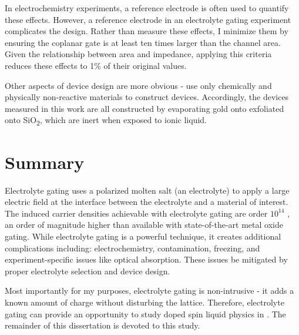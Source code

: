 In electrochemistry experiments, a reference electrode is often used to quantify these effects. However, a reference electrode in an electrolyte gating experiment complicates the design. Rather than measure these effects, I minimize them by ensuring the coplanar gate is at least ten times larger than the channel area. Given the relationship between area and impedance, applying this criteria reduces these effects to 1\% of their original values.

Other aspects of device design are more obvious - use only chemically and physically non-reactive materials to construct devices. Accordingly, the devices measured in this work are all constructed by evaporating gold onto \rucl exfoliated onto SiO\textsubscript{2}, which are inert when exposed to ionic liquid.

\section{Summary}

Electrolyte gating uses a polarized molten salt (an electrolyte) to apply a large electric field at the interface between the electrolyte and a material of interest. The induced carrier densities achievable with electrolyte gating are order $10^{14}$ \percmsq , an order of magnitude higher than available with state-of-the-art metal oxide gating. While electrolyte gating is a powerful technique, it creates additional complications including: electrochemistry, contamination, freezing, and experiment-specific issues like optical absorption. These issues be mitigated by proper electrolyte selection and device design.

Most importantly for my purposes, electrolyte gating is non-intrusive - it adds a known amount of charge without disturbing the lattice. Therefore, electrolyte gating can provide an opportunity to study doped spin liquid physics in \ruclnospace . The remainder of this dissertation is devoted to this study.